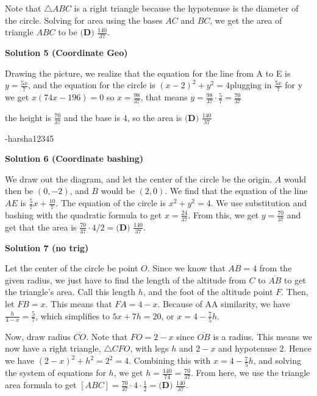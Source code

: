 \begin{enumerate}
 Note that $\triangle ABC$ is a right triangle because the hypotenuse is the diameter of the circle. Solving for area using the bases $AC$ and $BC$, we get the area of triangle $ABC$ to be $\boxed{\textbf{(D) } \frac{140}{37}}$.

 



\textbf{Solution 5 (Coordinate Geo)}

Drawing the picture, we realize that the equation for the line from A to E is $y=\frac{5x}{7}$, and the equation for the circle is $(x-2)^2+y^2=4$plugging in $\frac{5x}{7}$ for y we get $x(74x-196)=0$ so $x=\frac{98}{37}$, that means $y = \frac{98}{37} \cdot \frac{5}{7} = \frac{70}{37}$

 the height is $\frac{70}{37}$ and the base is $4$, so the area is $\boxed{\textbf{(D) } \frac{140}{37}}$

 -harsha12345

 



\textbf{Solution 6 (Coordinate bashing)}

We draw out the diagram, and let the center of the circle be the origin. $A$ would then be $(0,-2)$, and $B$ would be $(2,0)$. We find that the equation of the line $AE$ is $\frac{5}{7}x + \frac{10}{7}$. The equation of the circle is $x^2+y^2=4$. We use substitution and bashing with the quadratic formula to get $x = \frac{24}{37}$. From this, we get $y = \frac{70}{37}$ and get that the area is $\frac{70}{37}\cdot 4/2 = \boxed{\textbf{(D) } \frac{140}{37}}$.

 



\textbf{Solution 7 (no trig)}

Let the center of the circle be point $O$. Since we know that $AB = 4$ from the given radius, we just have to find the length of the altitude from $C$ to $\overline{AB}$ to get the triangle's area. Call this length $h$, and the foot of the altitude point $F$. Then, let $FB = x$. This means that $FA = 4 - x$. Because of AA similarity, we have $\frac{h}{4-x} = \frac{5}{7}$, which simplifies to $5x + 7h = 20$, or $x = 4 - \frac{7}{5}h$.

 Now, draw radius $\overline{CO}$. Note that $FO = 2 - x$ since $\overline{OB}$ is a radius. This means we now have a right triangle, $\triangle CFO$, with legs $h$ and $2 - x$ and hypotenuse $2$. Hence we have $(2 - x)^2 + h^2 = 2^2 = 4$. Combining this with $x = 4 - \frac{7}{5}h$, and solving the system of equations for $h$, we get $h = \frac{140}{74} = \frac{70}{37}$. From here, we use the triangle area formula to get $[ABC] = \frac{70}{37} \cdot 4 \cdot \frac{1}{2} = \boxed{\textbf{(D) } \frac{140}{37}}$.


\end{enumerate}
